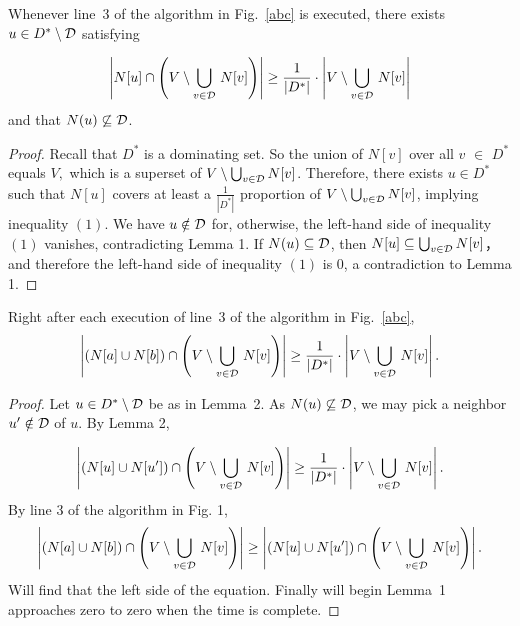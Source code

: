 \documentclass[12pt]{article}
\begin{document}
\begin{lemma}
Whenever line~3 of the algorithm in Fig.~\ref{abc} is executed,
there exists $u\in D^*\setminus {\cal D}$ satisfying

\begin{equation}
\left|N[u]\cap \left(V\setminus \bigcup_{v\in {\cal D}}\,N[v]\right)\right|
\ge \frac{1}{|D^*|}
\cdot\left|V\setminus \bigcup_{v\in {\cal D}}\,N[v]\right|
\label{lemma2-equation}
\end{equation}
and that $N(u)\not\subseteq {\cal D}$.
\end{lemma}

\begin{proof}
Recall that $D^*$ is a dominating set. So the union of $N[v]$ over all $v$ $\in$ $D^*$ equals $V, $ which is a superset of $V\setminus \bigcup_{v\in{\cal D}} N[v]$. Therefore, there exists $u\in D^*$ such that $N[u]$ covers at least a $\frac{1}{|D^*|}$ proportion of $V\setminus \bigcup_{v\in{\cal D}} N[v]$, implying inequality $(1)$. We have $u\notin {\cal D}$ for, otherwise, the left-hand side of inequality $(1)$ vanishes, contradicting Lemma 1.
If $N(u)\subseteq {\cal D}$,  then $N[u]\subseteq \bigcup_{v\in {\cal D}} N[v]$， and therefore the left-hand side of inequality $(1)$ is 0, a contradiction to Lemma 1.
\end{proof}



\clearpage

\begin{lemma}
Right after each execution of line~3 of the algorithm in Fig.~\ref{abc},
\begin{equation}
\left|\left(N[a]\cup N[b]\right)\cap \left(V\setminus \bigcup_{v\in {\cal D}}\,N[v]\right)\right|
\ge \frac{1}{|D^*|}
\cdot\left|V\setminus \bigcup_{v\in {\cal D}}\,N[v]\right|.
\end{equation}
\end{lemma}
\begin{proof}
Let $u\in D^*\setminus {\cal D}$ be as in Lemma~2. As $N(u)\not\subseteq {\cal D}$, we may pick a neighbor $u'\notin {\cal D}$ of $u$. By Lemma 2,

\begin{equation}
\left|\left(N[u]\cup N[u']\right)\cap \left(V\setminus \bigcup_{v\in {\cal D}}\,N[v]\right)\right|
\ge \frac{1}{|D^*|}
\cdot\left|V\setminus \bigcup_{v\in {\cal D}}\,N[v]\right|.
\end{equation}
By line 3 of the algorithm in Fig. 1, 
\begin{equation}
\left|\left(N[a]\cup N[b]\right)\cap \left(V\setminus \bigcup_{v\in {\cal D}}\,N[v]\right)\right| \geq \left|\left(N[u]\cup N[u']\right)\cap \left(V\setminus \bigcup_{v\in {\cal D}}\,N[v]\right)\right|.
\end{equation}
Will find that the left side of the equation. Finally will begin Lemma~1 approaches zero to zero when the time is complete.
\end{proof}
\end{document}
